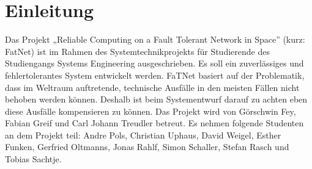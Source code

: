 \section{Einleitung}
\label{Einleitung}
Das Projekt „Reliable Computing on a Fault Tolerant Network in Space” (kurz: FatNet) ist im Rahmen des Systemtechnikprojekts für Studierende des Studiengangs Systems Engineering ausgeschrieben. Es soll ein zuverlässiges und fehlertolerantes System entwickelt werden. FaTNet basiert auf der Problematik, dass im Weltraum auftretende, technische Ausfälle in den meisten Fällen nicht behoben werden können. Deshalb ist beim Systementwurf darauf zu achten eben diese Ausfälle kompensieren zu können.
Das Projekt wird von Görschwin Fey, Fabian Greif und Carl Johann Treudler betreut.
Es nehmen folgende Studenten an dem Projekt teil: Andre Pols, Christian Uphaus, David Weigel, Esther Funken, Gerfried Oltmanns, Jonas Rahlf, Simon Schaller, Stefan Rasch und Tobias Sachtje.